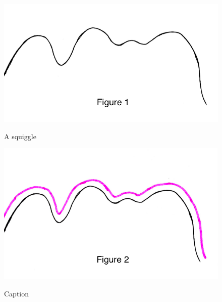 \begin{figure}[H] %
  \centering %
  \begin{minipage}[b]{\w} %
    \centering %
    \includegraphics[width=\fw]{img/01-intro/01.png}
    \caption{A squiggle}
    \vspace{4ex}
  \end{minipage} %
  \begin{minipage}[b]{\w}
    \centering
    \label{intro:2}
    \includegraphics[width=\fw]{img/01-intro/02.png}
    \caption{Caption}
    \vspace{4ex}
  \end{minipage} %
  \begin{minipage}[b]{\w}
    \centering
    \label{intro:3}

\end{minipage}
\end{figure}
